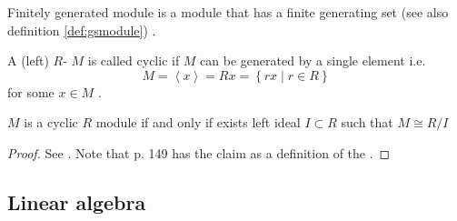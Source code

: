 \begin{appendices}
\begin{definition}
  Finitely generated module is a module that has a finite generating
  set (see also definition \ref{def:gsmodule}) \cite{wiki:fgmodule}.
  \label{def:fgmodule}
\end{definition}

\begin{definition}
  A (left) $R$- $M$ is called cyclic if $M$ can be
  generated by 
  a single element i.e.
  \[
  M = \left<x\right>=R x = \left\{rx \mid r \in R\right\}
  \]
  for some $x \in M$ \cite{wiki:cyclicmodule}.
  \label{def:cyclicmodule}
\end{definition}

\begin{claim}
  $M$ is a cyclic $R$ module if and only if exists left ideal $I
  \subset R$ such that $M \cong R/I$
  \begin{proof}
    See \cite{mathstackexchange:cyclicmodule}. Note that
    \cite{bib:lang} p. 149 has
    the claim as a definition of the .
  \end{proof}
  \label{claim:cyclicmodule}
\end{claim}

\subsection{Linear algebra}


\end{appendices}
